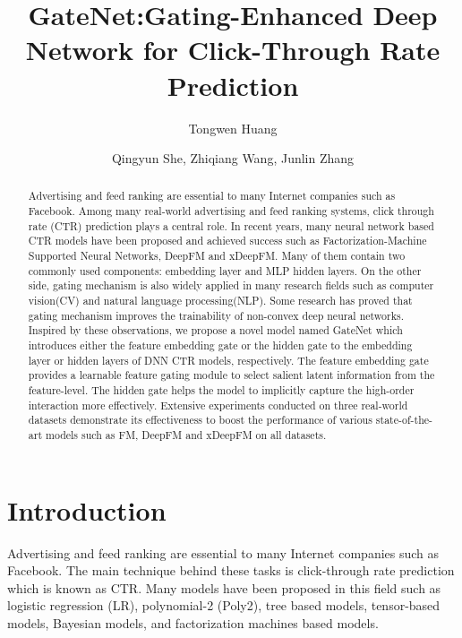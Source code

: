 \documentclass[sigconf,nonacm=true]{acmart}
\begin{document}
\title{GateNet:Gating-Enhanced Deep Network for Click-Through Rate Prediction}



\author{Tongwen Huang}

\author{Qingyun She, Zhiqiang Wang, Junlin Zhang}


\renewcommand{\shortauthors}{Tongwen Huang et al.}

\begin{abstract}
Advertising and feed ranking are essential to many Internet companies such as Facebook. Among many real-world advertising and feed ranking systems, click through rate (CTR) prediction plays a central role. In recent years, many neural network based  CTR models have been proposed and achieved success such as Factorization-Machine Supported Neural Networks, DeepFM and xDeepFM. Many of them contain two commonly used  components: embedding layer and MLP hidden layers. On the other side, gating mechanism is also widely applied in many research fields such as computer vision(CV) and natural language processing(NLP). Some research has proved that gating mechanism improves the trainability of non-convex deep neural networks. Inspired by these observations, we propose a novel model named GateNet which introduces either the feature embedding gate or the hidden gate to the embedding layer or hidden layers of DNN CTR models, respectively. The feature embedding gate provides a learnable feature gating module to select salient latent information from the feature-level. The hidden gate helps the model to implicitly capture the high-order interaction more effectively. Extensive experiments conducted on three real-world datasets demonstrate its effectiveness to boost the performance of various state-of-the-art models such as FM, DeepFM and xDeepFM on all datasets.
\end{abstract}

\maketitle


\section{Introduction}
Advertising and feed ranking are essential to many Internet companies such as Facebook. 
The main technique behind these tasks is click-through rate prediction which is known as CTR. 
Many models have been proposed in this field such as logistic regression (LR)\cite{mcmahan2013ad}, 
polynomial-2 (Poly2)\cite{juan2016field}, tree based models\cite{he2014practical}, tensor-based models\cite{koren2009matrix}, 
Bayesian models\cite{graepel2010web}, and factorization machines based models\cite{rendle2010factorization,juan2016field}.
\end{document}
